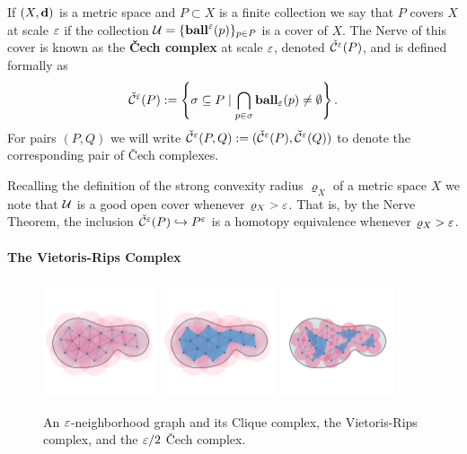 If $(X,\mathbf{d})$ is a metric space and $P\subset X$ is a finite collection we say that $P$ covers $X$ at scale $\varepsilon$ if the collection $\mathcal{U} = \{\mathbf{ball}^\varepsilon(p)\}_{p\in P}$ is a cover of $X$.
The Nerve of this cover is known as the \textbf{\v Cech complex} at scale $\varepsilon$, denoted $\check{\mathcal{C}}^\varepsilon(P)$, and is defined formally as
\[ \check{\mathcal{C}}^\varepsilon(P) := \left\{\sigma \subseteq P\mid \bigcap_{p\in \sigma}\mathbf{ball}_\varepsilon(p)\neq \emptyset \right\}. \]
For pairs $(P, Q)$ we will write $\check{\mathcal{C}}^\varepsilon(P,Q) := (\check{\mathcal{C}}^\varepsilon(P), \check{\mathcal{C}}^\varepsilon(Q))$ to denote the corresponding pair of \v Cech complexes.

Recalling the definition of the strong convexity radius $\varrho_X$ of a metric space $X$ we note that $\mathcal{U}$ is a good open cover whenever $\varrho_X > \varepsilon$.
That is, by the Nerve Theorem, the inclusion $\check{\mathcal{C}}^\varepsilon(P)\hookrightarrow P^\varepsilon$ is a homotopy equivalence whenever $\varrho_X > \varepsilon$.

\paragraph{The Vietoris-Rips Complex}

\begin{figure}[htbp]
  \centering
  \includegraphics[trim=0 300 0 500, clip, width=0.3\textwidth]{figures/rips/graph2}
  \includegraphics[trim=0 300 0 500, clip, width=0.3\textwidth]{figures/rips/rips2}
  \includegraphics[trim=0 300 0 500, clip, width=0.3\textwidth]{figures/rips/cech}
  \caption{An $\varepsilon$-neighborhood graph and its Clique complex, the Vietoris-Rips complex, and the $\varepsilon/2$ \v Cech complex.}\label{fig:rips}
\end{figure}

